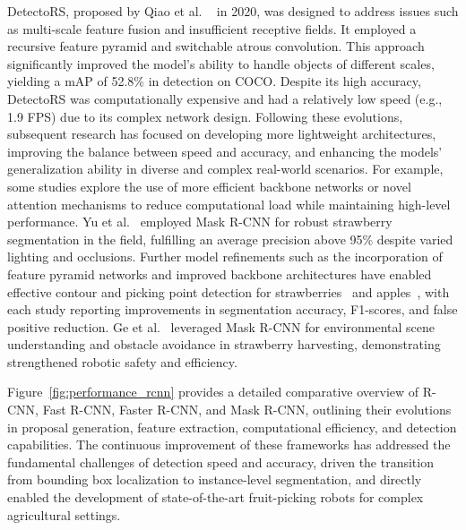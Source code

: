 \documentclass[a4paper,fleqn]{cas-dc}
\begin{document}
DetectoRS, proposed by Qiao et al. ~\cite{qiao2021detectors} in 2020, was designed to address issues such as multi-scale feature fusion and insufficient receptive fields. It employed a recursive feature pyramid and switchable atrous convolution. This approach significantly improved the model's ability to handle objects of different scales, yielding a mAP of 52.8\% in detection on COCO. Despite its high accuracy, DetectoRS was computationally expensive and had a relatively low speed (e.g., 1.9 FPS) due to its complex network design.
Following these evolutions, subsequent research has focused on developing more lightweight architectures, improving the balance between speed and accuracy, and enhancing the models' generalization ability in diverse and complex real-world scenarios. For example, some studies explore the use of more efficient backbone networks or novel attention mechanisms to reduce computational load while maintaining high-level performance.
Yu et al.~\cite{yu2019fruit} employed Mask R-CNN for robust strawberry segmentation in the field, fulfilling an average precision above 95\% despite varied lighting and occlusions. Further model refinements such as the incorporation of feature pyramid networks and improved backbone architectures have enabled effective contour and picking point detection for strawberries~\cite{jia2020detection} and apples~\cite{chu2021deep}, with each study reporting improvements in segmentation accuracy, F1-scores, and false positive reduction. Ge et al.~\cite{ge2019fruit} leveraged Mask R-CNN for environmental scene understanding and obstacle avoidance in strawberry harvesting, demonstrating strengthened robotic safety and efficiency.

Figure~\ref{fig:performance_rcnn} provides a detailed comparative overview of R-CNN, Fast R-CNN, Faster R-CNN, and Mask R-CNN, outlining their evolutions in proposal generation, feature extraction, computational efficiency, and detection capabilities. The continuous improvement of these frameworks has addressed the fundamental challenges of detection speed and accuracy, driven the transition from bounding box localization to instance-level segmentation, and directly enabled the development of state-of-the-art fruit-picking robots for complex agricultural settings.
\end{document}
